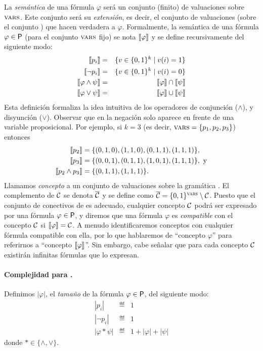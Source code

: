 La {\em semántica} de una fórmula $\varphi$ será un conjunto (finito) de valuaciones sobre $\textsc{vars}$. Este conjunto será su {\em extensión}, es decir, el conjunto de valuaciones (sobre el conjunto \propvars) que hacen verdadera a $\varphi$. 
%
Formalmente, la semántica de una fórmula $\varphi\in{\sf P}$ (para el conjunto $\textsc{vars}$ fijo) se nota $\llbracket \varphi\rrbracket$  y se define recursivamente del siguiente modo:
%
\begin{eqnarray*}
\llbracket p_i\rrbracket &=& \{ v\in\{0,1\}^k \mid v(i)=1\}\\
\llbracket \lnot p_i\rrbracket &=& \{ v\in\{0,1\}^k \mid v(i)=0\}\\
\llbracket \varphi\wedge\psi\rrbracket &=& \llbracket \varphi\rrbracket\cap\llbracket \psi\rrbracket\\
\llbracket \varphi\vee\psi\rrbracket &=& \llbracket \varphi\rrbracket\cup\llbracket \psi\rrbracket
\end{eqnarray*}
%
Esta definición formaliza la idea intuitiva de los operadores de conjunción ($\wedge$), y disyunción ($\vee$). Observar que en \grambool la negación solo aparece en frente de una variable proposicional. Por ejemplo, si $k=3$ (es decir, $\textsc{vars}=\{p_1,p_2,p_3\}$) entonces 
\begin{align*}
\llbracket p_2\rrbracket&=\{(0,1,0), (1,1,0), (0,1,1), (1,1,1)\},\\
\llbracket p_3\rrbracket&=\{(0,0,1), (0,1,1), (1,0,1), (1,1,1)\}, \textrm{ y}\\
\llbracket p_2\wedge p_3\rrbracket&=\{(0,1,1), (1,1,1)\}.
\end{align*}
Llamamos {\em concepto} a un conjunto de valuaciones sobre la gramática \grambool. El complemento de $\mathcal{C}$ se denota $\overline {\mathcal{C}}$ y se define como $\overline {\mathcal{C}}=\{0,1\}^{\textsc{vars}}\setminus \mathcal{C}$. Puesto que el conjunto de conectivos de \grambool es adecuado, cualquier concepto $\mathcal{C}$ podrá ser expresado por una fórmula $\varphi\in{\sf P}$, y diremos que una fórmula $\varphi$ es {\em compatible} con el concepto $\mathcal{C}$ si $\llbracket \varphi\rrbracket=\mathcal{C}$. A menudo identificaremos conceptos con cualquier fórmula compatible con ella, por lo que hablaremos de ``concepto $\varphi$'' para referirnos a ``concepto $\llbracket \varphi\rrbracket$''. Sin embargo, cabe señalar que para cada concepto $\mathcal{C}$ existirán infinitas fórmulas que lo expresan.

\paragraph{Complejidad para \grambool.} Definimos $|\varphi|$, el {\em tamaño} de la fórmula $\varphi\in{\sf P}$, del siguiente modo:
\begin{eqnarray*}
|p_i| &\eqdef& 1\\
|\lnot p_i| &\eqdef& 1\\
|\varphi*\psi| &\eqdef& 1+|\varphi|+|\psi|
\end{eqnarray*}
donde $*\in\{\wedge,\vee\}$.


